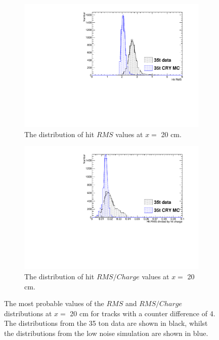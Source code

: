 \begin{figure}[h!]
  \centering
  \begin{subfigure}{0.45\textwidth}
    \centering
    \includegraphics[width=\textwidth]{CombCan_0}
    \caption{The distribution of hit $RMS$ values at $x =$ 20 cm.}
  \end{subfigure}
  \hspace{0.08\textwidth}
  \begin{subfigure}{0.45\textwidth}
    \centering
    \includegraphics[width=\textwidth]{CombCan_2}
    \caption{The distribution of hit $RMS/Charge$ values at $x =$ 20 cm.}
  \end{subfigure}
  \caption[The most probable values of the $RMS$ and $RMS/Charge$ distributions for tracks with a counter difference of 4 in a low noise 35 ton detector]
          {The most probable values of the $RMS$ and $RMS/Charge$ distributions at $x =$ 20 cm for tracks with a counter difference of 4. The distributions from the 35 ton data are shown in black, whilst the distributions from the low noise simulation are shown in blue.}
          \label{fig:DiffMCHitFit}
\end{figure}

